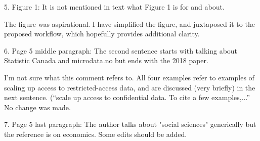 \begin{referee}
5.
Figure 1: It is not mentioned in text what Figure 1 is for and about.

\end{referee}

\begin{response}
    The figure was aspirational. I have simplified the figure, and juxtaposed it to the proposed workflow, which hopefully provides additional clarity.
\end{response}


\begin{referee}
6.
Page 5 middle paragraph: The second sentence starts with talking about Statistic Canada and
microdata.no but ends with the 2018 paper.

\end{referee}

\begin{response}
    I'm not sure what this comment refers to. All four examples refer to examples of scaling up access to restricted-access data, and are discussed (very briefly) in the next sentence. (``scale up access to
confidential data. To cite a few examples,...'' No change was made.
\end{response}


\begin{referee}

7.
Page 5 last paragraph: The author talks about "social sciences" generically but the reference is
on economics. Some edits should be added.

\end{referee}


